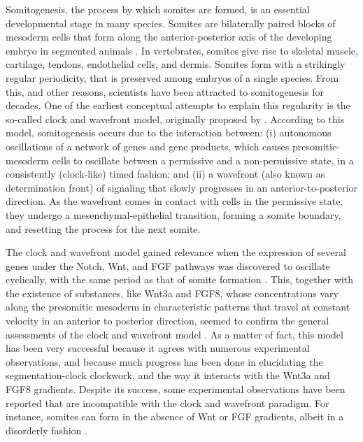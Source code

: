 \documentclass[11pt]{article}
\begin{document}
	Somitogenesis, the process by which somites are formed, is an essential
	developmental stage in many species. Somites are bilaterally paired blocks of
	mesoderm cells that form along the anterior-posterior axis of the developing
	embryo in segmented animals \citep{Maroto2012}. In vertebrates, somites give
	rise to skeletal muscle, cartilage, tendons, endothelial cells, and dermis.
	Somites form with a strikingly regular periodicity, that is preserved among
	embryos of a single species. From this, and other reasons, scientists have been
	attracted to somitogenesis for decades. One of the earliest conceptual attempts
	to explain this regularity is the so-called clock and wavefront model,
	originally proposed by \citet{Cooke1976}. According to this model, somitogenesis
	occurs due to the interaction between: (i) autonomous oscillations of a network
	of genes and gene products, which causes presomitic-mesoderm cells to oscillate
	between a permissive and a non-permissive state, in a consistently (clock-like)
	timed fashion; and (ii) a wavefront (also known as determination front) of
	signaling that slowly progresses in an anterior-to-posterior direction. As the
	wavefront comes in contact with cells in the permissive state, they undergo a
	mesenchymal-epithelial transition, forming a somite boundary, and resetting the
	process for the next somite.
	
	The clock and wavefront model gained relevance when the expression of several
	genes under the Notch, Wnt, and FGF pathways was discovered to oscillate
	cyclically, with the same period as that of somite formation
	\citep{Palmeirim1997, Pourquie2001, Gibb2010, Pourquie2011}. This, together with
	the existence of substances, like Wnt3a and FGF8, whose concentrations
	vary along the presomitic mesoderm in characteristic patterns that travel at
	constant velocity in an anterior to posterior direction, seemed to confirm the
	general assessments of the clock and wavefront model \citep{Dubrulle2001,
		Gibb2010, Pourquie2011}. As a matter of fact, this model has been very
	successful because it agrees with numerous experimental observations, and
	because much progress has been done in elucidating the segmentation-clock
	clockwork, and the way it interacts with the Wnt3a and FGF8 gradients.
	Despite its success, some experimental observations have been reported that are
	incompatible with the clock and wavefront paradigm. For instance, somites can
	form in the absence of Wnt or FGF gradients, albeit in a disorderly
	fashion \citep{Naiche2011,Dias2014}.
	
\end{document}

